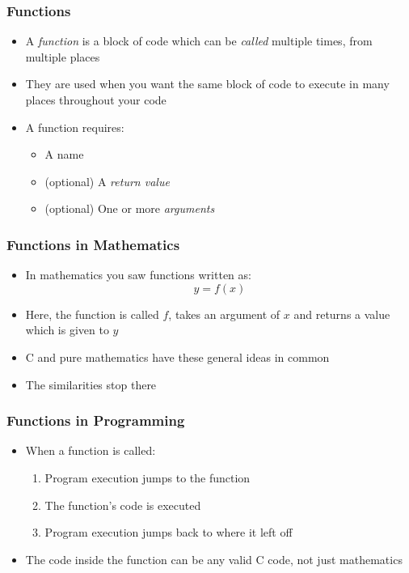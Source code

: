 \documentclass[14pt]{beamer}
\begin{document}
\begin{frame}
\frametitle{Functions}
\begin{itemize}
\item A \textit{function} is a block of code which can be \textit{called} multiple times, from multiple places
\item They are used when you want the same block of code to execute in many places throughout your code
\item A function requires:
	\begin{itemize}
		\item A name
		\item (optional) A \textit{return value}
		\item (optional) One or more \textit{arguments}
	\end{itemize}
\end{itemize}
\end{frame}

\begin{frame}
\frametitle{Functions in Mathematics}
\begin{itemize}
\item In mathematics you saw functions written as:
\begin{equation*}
y = f(x)
\end{equation*}
\item Here, the function is called $f$, takes an argument of $x$ and returns a value which is given to $y$
\item C and pure mathematics have these general ideas in common
\pause
\item The similarities stop there
\end{itemize}
\end{frame}

\begin{frame}[fragile]
\frametitle{Functions in Programming}
\begin{itemize}
\item When a function is called:
	\begin{enumerate}
		\item Program execution jumps to the function
		\item The function's code is executed
		\item Program execution jumps back to where it left off
	\end{enumerate}
\item The code inside the function can be any valid C code, not just mathematics
\end{itemize}
\end{frame}
\end{document}

